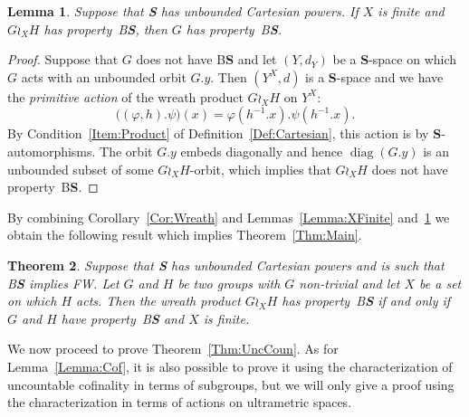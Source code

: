 \documentclass[a4paper]{article}
\newtheorem{lem}{Lemma}[section]
\newtheorem{thm}[lem]{Theorem}
\theoremstyle{definition}
\DeclareMathOperator\diag{diag}
\newcommand*{\category}[1]{\textbf{#1}}
\newcommand*{\CatS}{\category{S}}
\newcommand*{\BS}{B\textbf{S}}
\newcommand*{\FW}{FW}
\begin{document}
%
%
\begin{lem}\label{Lemma:Unboundedness}
Suppose that \CatS{} has unbounded Cartesian powers. If $X$ is finite and $G\wr_XH$ has property~\BS, then $G$ has property~\BS.
\end{lem}
\begin{proof}
Suppose that $G$ does not have \BS{} and let $(Y,d_Y)$ be a \CatS-space on which $G$ acts with an unbounded orbit $G.y$.
Then $(Y^X,d)$ is a \CatS-space and we have the \emph{primitive action} of the wreath product $G\wr_XH$ on $Y^X$:
\[
	\bigl((\varphi,h).\psi\bigr)(x)=\varphi(h^{-1}.x).\psi(h^{-1}.x).
\]
By Condition~\ref{Item:Product} of Definition~\ref{Def:Cartesian}, this action is by \CatS-automorphisms.
The orbit $G.y$ embeds diagonally and hence $\diag(G.y)$ is an unbounded subset of some $G\wr_XH$-orbit, which implies that $G\wr_XH$ does not have property~\BS.
\end{proof}
%
%
By combining Corollary~\ref{Cor:Wreath} and Lemmas~\ref{Lemma:XFinite} and~\ref{Lemma:Unboundedness} we obtain the following result which implies Theorem~\ref{Thm:Main}.
%
%
\begin{thm}\label{Thm:Technic}
Suppose that \CatS{} has unbounded Cartesian powers and is such that \BS{} implies \FW.
Let $G$ and $H$ be two groups with $G$ non-trivial and let $X$ be a set on which $H$ acts. Then the wreath product $G \wr_X H$ has property~\BS{} if and only if $G$ and $H$ have property~\BS{} and $X$ is finite.
\end{thm}
%
%
We now proceed to prove Theorem~\ref{Thm:UncCoun}.
As for Lemma~\ref{Lemma:Cof}, it is also possible to prove it using the characterization of uncountable cofinality in terms of subgroups, but we will only give a proof using the characterization in terms of actions on ultrametric spaces.
\end{document}
